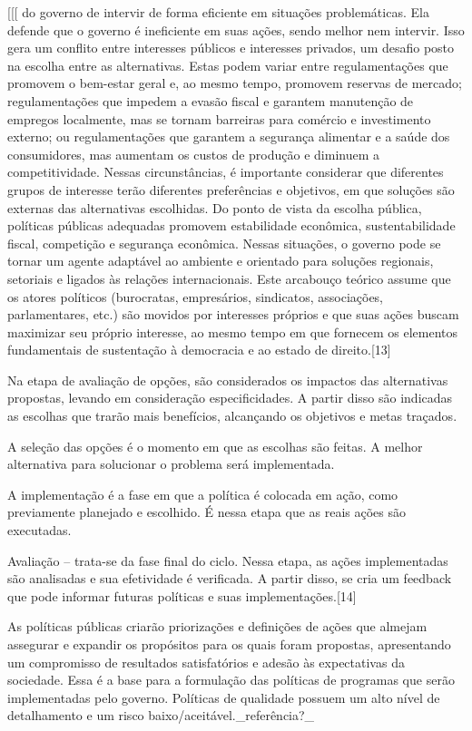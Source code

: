 \documentclass[
   article,       
   12pt,          
   oneside,       
   a4paper,       
   english,       
   brazil,        
   sumario=tradicional
   ]{abntex2}
\begin{document}
[[[ do governo de intervir de forma eficiente em situações problemáticas. Ela defende que o governo é ineficiente em suas ações, sendo melhor nem intervir. Isso gera um conflito entre interesses públicos e interesses privados, um desafio posto na escolha entre as alternativas. Estas podem variar entre regulamentações que promovem o bem-estar geral e, ao mesmo tempo, promovem reservas de mercado; regulamentações que impedem a evasão fiscal e garantem manutenção de empregos localmente, mas se tornam barreiras para comércio e investimento externo; ou regulamentações que garantem a segurança alimentar e a saúde dos consumidores, mas aumentam os custos de produção e diminuem a competitividade. Nessas circunstâncias, é importante considerar que diferentes grupos de interesse terão diferentes preferências e objetivos, em que soluções são externas das alternativas escolhidas. Do ponto de vista da escolha pública, políticas públicas adequadas promovem estabilidade econômica, sustentabilidade fiscal, competição e segurança econômica. Nessas situações, o governo pode se tornar um agente adaptável ao ambiente e orientado para soluções regionais, setoriais e ligados às relações internacionais. Este arcabouço teórico assume que os atores políticos (burocratas, empresários, sindicatos, associações, parlamentares, etc.) são movidos por interesses próprios e que suas ações buscam maximizar seu próprio interesse, ao mesmo tempo em que fornecem os elementos fundamentais de sustentação à democracia e ao estado de direito.[13]

Na etapa de avaliação de opções, são considerados os impactos das alternativas propostas, levando em consideração especificidades. A partir disso são indicadas as escolhas que trarão mais benefícios, alcançando os objetivos e metas traçados.

A seleção das opções é o momento em que as escolhas são feitas. A melhor alternativa para solucionar o problema será implementada.

A implementação é a fase em que a política é colocada em ação, como previamente planejado e escolhido. É nessa etapa que as reais ações são executadas.

Avaliação – trata-se da fase final do ciclo. Nessa etapa, as ações implementadas são analisadas e sua efetividade é verificada. A partir disso, se cria um feedback que pode informar futuras políticas e suas implementações.[14]

As políticas públicas criarão priorizações e definições de ações que almejam assegurar e expandir os propósitos para os quais foram propostas, apresentando um compromisso de resultados satisfatórios e adesão às expectativas da sociedade. Essa é a base para a formulação das políticas de programas que serão implementadas pelo governo. Políticas de qualidade possuem um alto nível de detalhamento e um risco baixo/aceitável._referência?_
\end{document}
